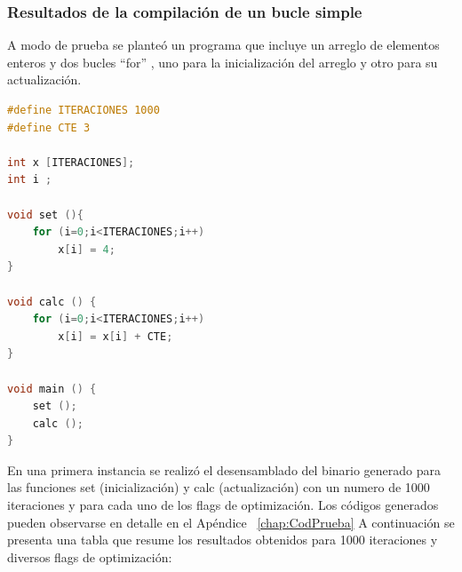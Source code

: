		\subsubsection{Resultados de la compilación de un bucle simple}

A modo de prueba se planteó un programa que incluye un arreglo de elementos enteros y dos bucles ``for'' , uno para la inicialización del arreglo y
otro para su actualización.

	\begin{lstlisting}[language=C,frame=single , caption={Código del programa de prueba de opciones de optimización del compilador (bucle simple) }]
#define ITERACIONES 1000
#define CTE 3

int x [ITERACIONES];
int i ;

void set (){
	for (i=0;i<ITERACIONES;i++)
		x[i] = 4;
}

void calc () {
	for (i=0;i<ITERACIONES;i++)
		x[i] = x[i] + CTE;
}

void main () {
	set ();
	calc ();
}
	\end{lstlisting}
		
En una primera instancia se realizó el desensamblado del binario generado para las funciones set (inicialización) y calc (actualización) con un
numero de 1000 iteraciones y para cada uno de los flags de optimización. Los códigos generados pueden observarse en detalle en el Apéndice
~\ref{chap:CodPrueba} 
\newpage		
A continuación se presenta una tabla que resume los resultados obtenidos para 1000 iteraciones y diversos flags de optimización:

